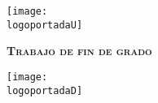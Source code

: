 \begin{titlepage}
\centering
\texttt{[image: \\logoportadaU]}\par\vspace{1cm}
\vfill
{\scshape\LARGE \textbf{Trabajo de fin de grado}\par}
\vspace{0.2cm}
{\Huge\bfseries\textcolor{color1}{\titulo}\par\vspace{1cm}}
\vfill
\texttt{[image: \\logoportadaD]}\par\vspace{1cm}
\vfill
\begin{tcolorbox}[colback=color1!5!white,colframe=color1!75!color1]
\centering
	{\large \autor \par \large \tutor}
\end{tcolorbox}
\vfill
\fecha\par
\vfill
\end{titlepage}
